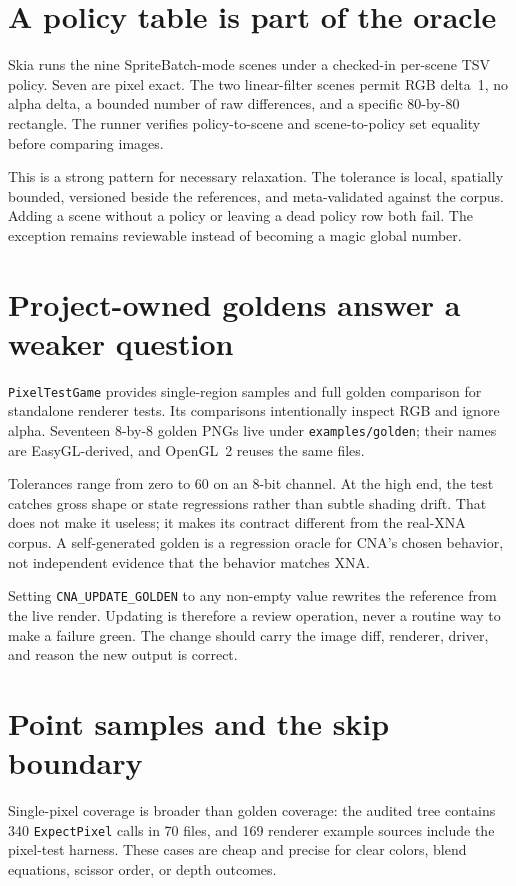 \section{A policy table is part of the oracle}

Skia runs the nine SpriteBatch-mode scenes under a checked-in per-scene TSV policy.  Seven are
pixel exact.  The two linear-filter scenes permit RGB delta~1, no alpha delta, a bounded number
of raw differences, and a specific 80-by-80 rectangle.  The runner verifies policy-to-scene and
scene-to-policy set equality before comparing images.

This is a strong pattern for necessary relaxation.  The tolerance is local, spatially bounded,
versioned beside the references, and meta-validated against the corpus.  Adding a scene without
a policy or leaving a dead policy row both fail.  The exception remains reviewable instead of
becoming a magic global number.

\section{Project-owned goldens answer a weaker question}

\texttt{PixelTestGame} provides single-region samples and full golden comparison for standalone
renderer tests.  Its comparisons intentionally inspect RGB and ignore alpha.  Seventeen 8-by-8
golden PNGs live under \texttt{examples/golden}; their names are EasyGL-derived, and OpenGL~2
reuses the same files.

Tolerances range from zero to 60 on an 8-bit channel.  At the high end, the test catches gross
shape or state regressions rather than subtle shading drift.  That does not make it useless; it
makes its contract different from the real-XNA corpus.  A self-generated golden is a regression
oracle for CNA's chosen behavior, not independent evidence that the behavior matches XNA.

Setting \texttt{CNA\_UPDATE\_GOLDEN} to any non-empty value rewrites the reference from the live
render.  Updating is therefore a review operation, never a routine way to make a failure green.
The change should carry the image diff, renderer, driver, and reason the new output is correct.

\section{Point samples and the skip boundary}

Single-pixel coverage is broader than golden coverage: the audited tree contains 340
\texttt{ExpectPixel} calls in 70 files, and 169 renderer example sources include the pixel-test
harness.  These cases are cheap and precise for clear colors, blend equations, scissor order,
or depth outcomes.

